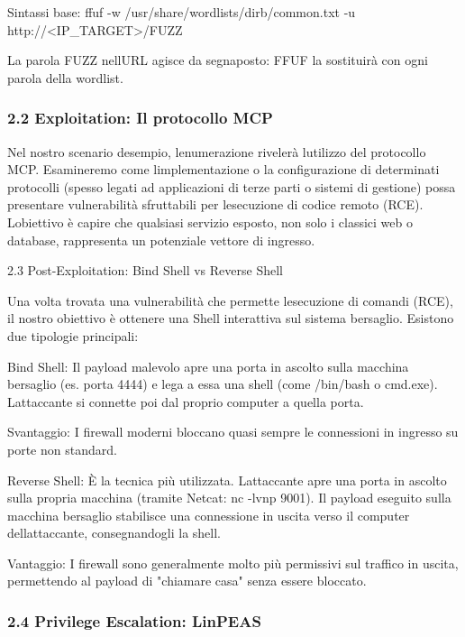 \documentclass[11pt,a4paper]{article}
\begin{document}
Sintassi base: ffuf -w /usr/share/wordlists/dirb/common.txt -u
http://\textless IP\_TARGET\textgreater/FUZZ

La parola FUZZ nell\textquotesingle URL agisce da segnaposto: FFUF la
sostituirà con ogni parola della wordlist.

\subsubsection{2.2 Exploitation: Il protocollo
MCP}\label{exploitation-il-protocollo-mcp}

Nel nostro scenario d\textquotesingle esempio,
l\textquotesingle enumerazione rivelerà l\textquotesingle utilizzo del
protocollo MCP. Esamineremo come l\textquotesingle implementazione o la
configurazione di determinati protocolli (spesso legati ad applicazioni
di terze parti o sistemi di gestione) possa presentare vulnerabilità
sfruttabili per l\textquotesingle esecuzione di codice remoto (RCE).
L\textquotesingle obiettivo è capire che qualsiasi servizio esposto, non
solo i classici web o database, rappresenta un potenziale vettore di
ingresso.

2.3 Post-Exploitation: Bind Shell vs Reverse Shell

Una volta trovata una vulnerabilità che permette
l\textquotesingle esecuzione di comandi (RCE), il nostro obiettivo è
ottenere una Shell interattiva sul sistema bersaglio. Esistono due
tipologie principali:

Bind Shell: Il payload malevolo apre una porta in ascolto sulla macchina
bersaglio (es. porta 4444) e lega a essa una shell (come /bin/bash o
cmd.exe). L\textquotesingle attaccante si connette poi dal proprio
computer a quella porta.

Svantaggio: I firewall moderni bloccano quasi sempre le connessioni in
ingresso su porte non standard.

Reverse Shell: È la tecnica più utilizzata. L\textquotesingle attaccante
apre una porta in ascolto sulla propria macchina (tramite Netcat: nc
-lvnp 9001). Il payload eseguito sulla macchina bersaglio stabilisce una
connessione in uscita verso il computer dell\textquotesingle attaccante,
consegnandogli la shell.

Vantaggio: I firewall sono generalmente molto più permissivi sul
traffico in uscita, permettendo al payload di "chiamare casa" senza
essere bloccato.

\subsubsection{2.4 Privilege Escalation:
LinPEAS}\label{privilege-escalation-linpeas}
\end{document}
